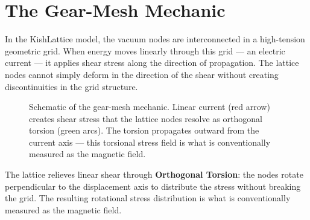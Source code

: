 \documentclass[11pt, letterpaper, openany]{book}
\begin{document}
\section{The Gear-Mesh Mechanic}

In the KishLattice model, the vacuum nodes are interconnected in a
high-tension geometric grid. When energy moves linearly through this grid
--- an electric current --- it applies shear stress along the direction of
propagation. The lattice nodes cannot simply deform in the direction of the
shear without creating discontinuities in the grid structure.

\begin{figure}[H]
\centering
{}
\caption{Schematic of the gear-mesh mechanic. Linear current (red arrow)
creates shear stress that the lattice nodes resolve as orthogonal torsion
(green arcs). The torsion propagates outward from the current axis — this
torsional stress field is what is conventionally measured as the magnetic field.}
\end{figure}

The lattice relieves linear shear through \textbf{Orthogonal Torsion}: the
nodes rotate perpendicular to the displacement axis to distribute the stress
without breaking the grid. The resulting rotational stress distribution is
what is conventionally measured as the magnetic field.
\end{document}
